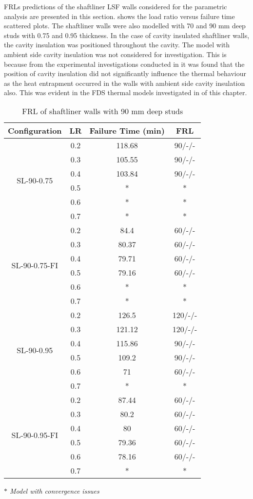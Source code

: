 FRLs predictions of the shaftliner LSF walls considered for the parametric analysis are presented in this section.  shows the load ratio versus failure time scattered plots. The shaftliner walls were also modelled with 70 and 90 mm deep studs with 0.75 and 0.95 thickness. In the case of cavity insulated shaftliner walls, the cavity insulation was positioned throughout the cavity. The model with ambient side cavity insulation was not considered for investigation. This is because from the experimental investigations conducted in  it was found that the position of cavity insulation did not significantly influence the thermal behaviour as the heat entrapment occurred in the walls with ambient side cavity insulation also. This was evident in the FDS thermal models investigated in  of this chapter.
\begin{table}[!htbp]
	\centering
	\caption{FRL of shaftliner walls with 90 mm deep studs}
	  \begin{tabular}{cccc}
	  \toprule
	  Configuration & LR    & Failure Time (min) & FRL \\
	  \midrule
	  \multirow{6}[2]{*}{SL-90-0.75} & 0.2   & 118.68 & 90/-/- \\
			& 0.3   & 105.55 & 90/-/- \\
			& 0.4   & 103.84 & 90/-/- \\
			& 0.5   & *     & * \\
			& 0.6   & *     & * \\
			& 0.7   & *     & * \\
	  \midrule
	  \multirow{6}[2]{*}{SL-90-0.75-FI} & 0.2   & 84.4  & 60/-/- \\
			& 0.3   & 80.37 & 60/-/- \\
			& 0.4   & 79.71 & 60/-/- \\
			& 0.5   & 79.16 & 60/-/- \\
			& 0.6   & *     & * \\
			& 0.7   & *     & * \\
	  \midrule
	  \multirow{6}[2]{*}{SL-90-0.95} & 0.2   & 126.5 & 120/-/- \\
			& 0.3   & 121.12 & 120/-/- \\
			& 0.4   & 115.86 & 90/-/- \\
			& 0.5   & 109.2 & 90/-/- \\
			& 0.6   & 71    & 60/-/- \\
			& 0.7   & *     & * \\
	  \midrule
	  \multirow{6}[2]{*}{SL-90-0.95-FI} & 0.2   & 87.44 & 60/-/- \\
			& 0.3   & 80.2  & 60/-/- \\
			& 0.4   & 80    & 60/-/- \\
			& 0.5   & 79.36 & 60/-/- \\
			& 0.6   & 78.16 & 60/-/- \\
			& 0.7   & *     & * \\
	  \bottomrule
	  \end{tabular}%
	\label{tab:frl-parametric-sl-90}%

	\small \textit{$*$ Model with convergence issues}
  \end{table}%

